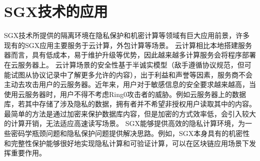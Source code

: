 \documentclass{source/Paper}
\begin{document}
    \section{SGX技术的应用}
        SGX技术所提供的隔离环境在隐私保护和机密计算等领域有巨大应用前景，许多现有的SGX应用主要服务于云计算，外包计算等场景。
        云计算相比本地搭建服务器而言，具有低成本，易于维护升级等优势，因此越来越多计算服务会将程序部署在云服务器上。
        云计算场景的安全性基于半诚实模型（敌手遵循协议规范，但可能试图从协议记录中了解更多允许的内容），出于利益和声誉等因素，服务商不会主动去攻击用户的云服务器。近年来，用户对于敏感信息的安全要求越来越高，当使用云服务器时，用户不得不考虑Ring0攻击者的威胁。例如云服务器上的数据库，若其中存储了涉及隐私的数据，拥有者并不希望非授权用户读取其中的内容。最简单的方法是通过加密来保护数据库内容，但是加密的方式效率低，会引入较大的计算开销，无法适应高速读写场景。
        SGX能够提供高效的隐私计算环境，为一些密码学瓶颈问题和隐私保护问题提供解决思路。例如，SGX本身具有的机密性和完整性保护能够很好地实现隐私计算和可验证计算，可以在区块链应用场景下发挥重要作用。
\end{document}
